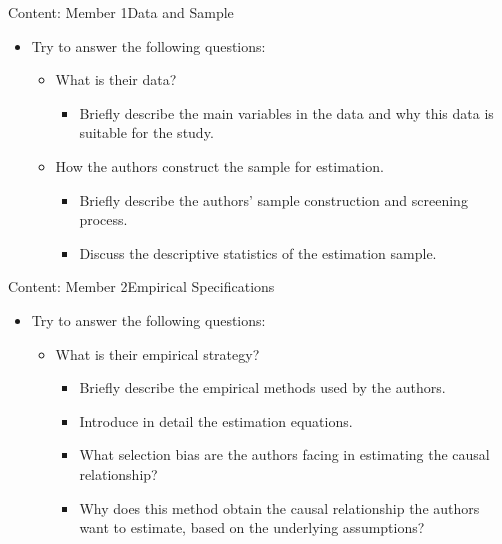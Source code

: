 \documentclass[hyperref={pdfpagelabels=false,hidelinks}]{beamer}
\begin{document}
\begin{frame}{Content: Member 1}{Data and Sample}
	\begin{itemize}
		\item Try to answer the following questions:
															\vspace{0.2cm}
		\begin{itemize}
			\item What is their data?
																\vspace{0.2cm}
			\begin{itemize}
				\item Briefly describe the main variables in the data and why this data is suitable for the study.
																	\vspace{0.2cm}
			\end{itemize}
			\item How the authors construct the sample for estimation.
																\vspace{0.2cm}
			\begin{itemize}
				\item Briefly describe the authors' sample construction and screening process.
																	\vspace{0.2cm}
				\item Discuss the descriptive statistics of the estimation sample.
			\end{itemize}
		\end{itemize}
	\end{itemize}
\end{frame}

\begin{frame}{Content: Member 2}{Empirical Specifications}
	\begin{itemize}
		\item Try to answer the following questions:
															\vspace{0.2cm}
		\begin{itemize}
			\item What is their empirical strategy?
																\vspace{0.2cm}
			\begin{itemize}
				\item Briefly describe the empirical methods used by the authors.
																	\vspace{0.2cm}
				\item Introduce in detail the estimation equations.
																	\vspace{0.2cm}
				\item What selection bias are the authors facing in estimating the causal relationship?
																	\vspace{0.2cm}
				\item Why does this method obtain the causal relationship the authors want to estimate, based on the underlying assumptions?
			\end{itemize}
		\end{itemize}
	\end{itemize}
\end{frame}
\end{document}

